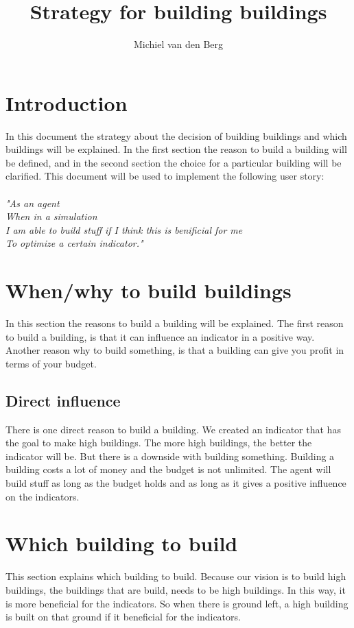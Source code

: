 \documentclass{article}
\author{Michiel van den Berg}
\title{Strategy for building buildings}
\begin{document}

\maketitle{}
\newpage{}

\section{Introduction}

In this document the strategy about the decision of building buildings and which buildings will be explained. In the first section the reason to build a building will be defined, and in the second section the choice for a particular building will be clarified. This document will be used to implement the following user story:\\
\\
\textit{"As an agent\\
When in a simulation\\
I am able to build stuff if I think 
this is benificial for me\\
To optimize a certain indicator."\\}

\section{When/why to build buildings}
In this section the reasons to build a building will be explained. The first reason to build a building, is that it can influence an indicator in a positive way. Another reason why to build something, is that a building can give you profit in terms of your budget.


\subsection{Direct influence}
There is one direct reason to build a building. We created an indicator that has the goal to make high buildings. The more high buildings, the better the indicator will be. But there is a downside with building something. Building a building costs a lot of money and the budget is not unlimited. The agent will build stuff as long as the budget holds and as long as it gives a positive influence on the indicators.


\section{Which building to build}
This section explains which building to build. Because our vision is to build high buildings, the buildings that are build, needs to be high buildings. In this way, it is more beneficial for the indicators. So when there is ground left, a high building is built on that ground if it beneficial for the indicators.
\end{document}
